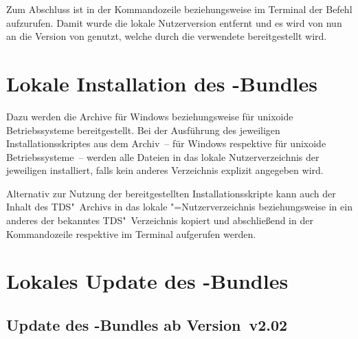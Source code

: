 Zum Abschluss ist in der Kommandozeile beziehungsweise im Terminal der Befehl 
 aufzurufen. Damit wurde die lokale Nutzerversion entfernt und es 
wird von nun an die Version von \TUDScript genutzt, welche durch die verwendete 
\Distro bereitgestellt wird.



\section{%
  Lokale Installation des \TUDScript-Bundles%
  \label{sec:local:install}%
}


Dazu werden die Archive  
für Windows beziehungsweise 
für unixoide Betriebssysteme bereitgestellt. Bei der Ausführung des jeweiligen 
Installationsskriptes aus dem Archiv~-- 
für Windows respektive  für unixoide 
Betriebssysteme~-- werden alle Dateien in das lokale Nutzerverzeichnis der 
jeweiligen \Distro installiert, falls kein anderes 
Verzeichnis explizit angegeben wird. 


Alternativ zur Nutzung der bereitgestellten Installationsskripte kann auch der 
Inhalt des TDS"~Archivs  in das lokale 
"=Nutzerverzeichnis beziehungsweise in ein anderes der 
\Distro bekanntes TDS"~Verzeichnis kopiert und 
abschließend in der Kommandozeile respektive im Terminal  
aufgerufen werden. 



\section{%
  Lokales Update des \TUDScript-Bundles%
  \label{sec:local:update}%
}
\subsection{Update des \TUDScript-Bundles ab Version~v2.02}

